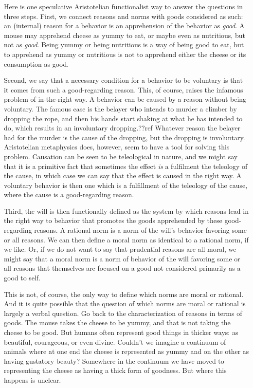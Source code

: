 Here is one speculative Aristotelian functionalist way to answer the questions in three steps. First, we connect reasons and norms with goods
considered as such: an (internal) reason 
for a behavior is an apprehension of the behavior as \textit{good}. A mouse may apprehend cheese as yummy to eat, or maybe even as nutritious, 
but not as \textit{good}. Being yummy or being nutritious is a way of being good to eat, but to apprehend as yummy or nutritious is not to apprehend either the cheese or its consumption as good.

Second, we say that a necessary condition for a behavior to be voluntary is that it 
comes from such a good-regarding reason. This, of course, raises the infamous problem of in-the-right way. A behavior can be caused by a reason
without being voluntary. The famous case is the belayer who intends to murder a climber by dropping the rope, and then
his hands start shaking at what he has intended to do, which results in an involuntary dropping.??ref Whatever reason 
the belayer had
for the murder is the cause of the dropping, but the dropping is involuntary. Aristotelian metaphysics does, however, seem
to have a tool for solving this problem. Causation can be seen to be teleological in nature, and we might say that it is 
a primitive fact that sometimes the effect \textit{is} a fulfilment the teleology of the cause, in which case we can say that the effect 
is caused in the right way. A voluntary behavior is then one which is a fulfillment of the teleology of the cause,
where the cause is a good-regarding reason.

Third, the will is then functionally defined as the system by which reasons lead in the right way to behavior that promotes 
the goods apprehended by these good-regarding reasons. A rational norm is a norm of the will's behavior
favoring some or all reasons. We can then define a moral norm as identical to a rational norm, if we like.
Or, if we do not want to say that prudential reasons are all moral, we might say that a moral norm is a 
norm of behavior of the will favoring some or all reasons that themselves are focused on  a good not considered 
primarily as a good to self. 

This is not, of course, the only way to define which norms are moral or rational. And it is quite possible that the question of which
norms are moral or rational is largely a verbal question. Go back to the characterization of reasons in terms of goods. The mouse takes
the cheese to be yummy, and that is not taking the cheese to be good. But humans often represent good things in thicker ways: as
beautiful, courageous, or even divine. Couldn't we imagine a continuum of animals where at one end the cheese is represented as 
yummy and on the other as having gustatory beauty? Somewhere in the continuum we have moved to representing the cheese as having a 
thick form of goodness. But where this happens is unclear. 

